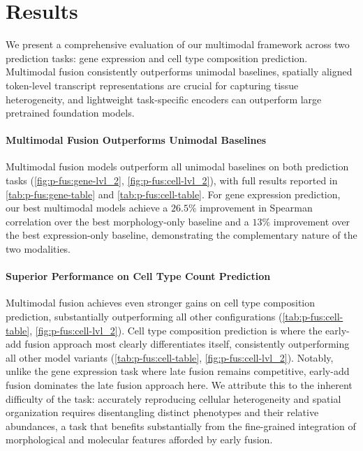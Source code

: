 \section{Results}
\label{sec:results}

We present a comprehensive evaluation of our multimodal framework across two prediction tasks: gene expression and cell type composition prediction. Multimodal fusion consistently outperforms unimodal baselines, spatially aligned token-level transcript representations are crucial for capturing tissue heterogeneity, and lightweight task-specific encoders can outperform large pretrained foundation models.

\paragraph{Multimodal Fusion Outperforms Unimodal Baselines}
\label{par:multimodal-fusion-outperforms-unimodal-baselines}

Multimodal fusion models outperform all unimodal baselines on both prediction tasks (\autoref{fig:p-fus:gene-lvl_2}, \autoref{fig:p-fus:cell-lvl_2}), with full results reported in \autoref{tab:p-fus:gene-table} and \autoref{tab:p-fus:cell-table}. For gene expression prediction, our best multimodal models achieve a $26.5\%$ improvement in Spearman correlation over the best morphology-only baseline and a $13\%$ improvement over the best expression-only baseline, demonstrating the complementary nature of the two modalities.

\paragraph{Superior Performance on Cell Type Count Prediction}
\label{par:superior-performance-on-cell-type-count-prediction}

Multimodal fusion achieves even stronger gains on cell type composition prediction, substantially outperforming all other configurations (\autoref{tab:p-fus:cell-table}, \autoref{fig:p-fus:cell-lvl_2}). Cell type composition prediction is where the early-add fusion approach most clearly differentiates itself, consistently outperforming all other model variants (\autoref{tab:p-fus:cell-table}, \autoref{fig:p-fus:cell-lvl_2}). Notably, unlike the gene expression task where late fusion remains competitive, early-add fusion dominates the late fusion approach here. We attribute this to the inherent difficulty of the task: accurately reproducing cellular heterogeneity and spatial organization requires disentangling distinct phenotypes and their relative abundances, a task that benefits substantially from the fine-grained integration of morphological and molecular features afforded by early fusion.

